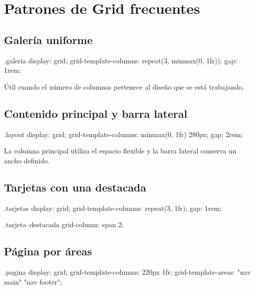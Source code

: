 \documentclass[11pt]{article}
\begin{document}
\section{Patrones de Grid frecuentes}

\subsection{Galería uniforme}

\begin{csscodedark}
.galeria {
    display: grid;
    grid-template-columns: repeat(3, minmax(0, 1fr));
    gap: 1rem;
}
\end{csscodedark}

Útil cuando el número de columnas pertenece al diseño que se está trabajando.

\subsection{Contenido principal y barra lateral}

\begin{csscodedark}
.layout {
    display: grid;
    grid-template-columns: minmax(0, 1fr) 280px;
    gap: 2rem;
}
\end{csscodedark}

La columna principal utiliza el espacio flexible y la barra lateral conserva un
ancho definido.

\subsection{Tarjetas con una destacada}

\begin{csscodedark}
.tarjetas {
    display: grid;
    grid-template-columns: repeat(3, 1fr);
    gap: 1rem;
}

.tarjeta--destacada {
    grid-column: span 2;
}
\end{csscodedark}

\subsection{Página por áreas}

\begin{csscodedark}
.pagina {
    display: grid;
    grid-template-columns: 220px 1fr;
    grid-template-areas:
        "nav main"
        "nav footer";
}
\end{csscodedark}

\end{document}
